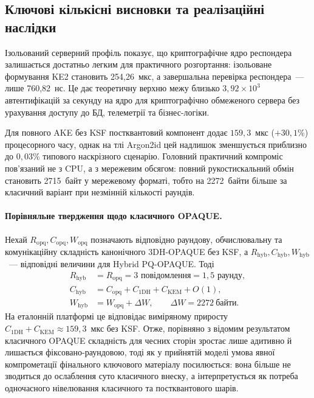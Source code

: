 \documentclass{llncs}
\begin{document}
\subsection{Ключові кількісні висновки та реалізаційні наслідки}

Ізольований серверний профіль показує, що криптографічне ядро
респондера залишається достатньо легким для практичного розгортання:
ізольоване формування KE2 становить 254,26~мкс, а завершальна
перевірка респондера~--- лише 760,82~нс. Це дає теоретичну верхню
межу близько $3{,}92 \times 10^3$ автентифікацій за секунду на ядро для
криптографічно обмеженого сервера без урахування доступу до БД,
телеметрії та бізнес-логіки.

Для повного AKE без KSF постквантовий компонент додає
$159{,}3$~мкс ($+30{,}1\%$) процесорного часу, однак на тлі Argon2id цей
надлишок зменшується приблизно до $0{,}03\%$ типового наскрізного
сценарію. Головний практичний компроміс пов'язаний не з CPU, а з
мережевим обсягом: повний рукостискальний обмін становить
2715~байт у мережевому форматі, тобто на 2272~байти більше за
класичний варіант при незмінній кількості раундів.

\paragraph{Порівняльне твердження щодо класичного OPAQUE.}
Нехай $R_{\mathrm{opq}}, C_{\mathrm{opq}}, W_{\mathrm{opq}}$ позначають
відповідно раундову, обчислювальну та комунікаційну складність
канонічного 3DH-OPAQUE без KSF, а
$R_{\mathrm{hyb}}, C_{\mathrm{hyb}}, W_{\mathrm{hyb}}$~--- відповідні
величини для Hybrid PQ-OPAQUE. Тоді
\[
  \begin{aligned}
    R_{\mathrm{hyb}} &= R_{\mathrm{opq}} = 3 \text{ повідомлення}
      = 1{,}5 \text{ раунду},\\
    C_{\mathrm{hyb}} &= C_{\mathrm{opq}} + C_{\mathrm{1DH}} +
      C_{\mathrm{KEM}} + O(1),\\
    W_{\mathrm{hyb}} &= W_{\mathrm{opq}} + \Delta W,\qquad
      \Delta W = 2272~\text{байти}.
  \end{aligned}
\]
На еталонній платформі це відповідає виміряному приросту
$C_{\mathrm{1DH}} + C_{\mathrm{KEM}} \approx 159{,}3$~мкс без KSF. Отже,
порівняно з відомим результатом класичного OPAQUE складність для
чесних сторін зростає лише адитивно й лишається фіксовано-раундовою,
тоді як у прийнятій моделі умова явної компрометації фінального
ключового матеріалу посилюється: вона більше не зводиться до
ослаблення суто класичного внеску, а інтерпретується як потреба
одночасного нівелювання класичного та постквантового шарів.
\end{document}
